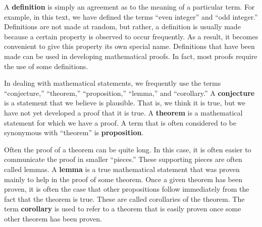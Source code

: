
A \textbf{definition}
\label{definition}%
%
 is simply an agreement as to the meaning of a particular term.  For example, in this text, we have defined the terms ``even integer'' and ``odd integer.''  Definitions are not made at random, but rather, a definition is usually made because a certain property is observed to occur frequently.  As a result, it becomes convenient to give this property its own special name.  Definitions that have been made can be used in developing mathematical proofs.  In fact, most proofs require the use of some definitions.

In dealing with mathematical statements, we frequently use the terms ``conjecture,'' ``theorem,'' ``proposition,'' ``lemma,'' and ``corollary.''  A \textbf{conjecture}
\label{conjecture}%
%
 is a statement that we believe is plausible.  That is, we think it is true, but we have not yet developed a proof that it is true.  A \textbf{theorem} 
\label{theorem}%
%
 is a mathematical statement for which we have a proof.  A term that is often considered to be synonymous with ``theorem'' is \textbf{proposition}. 
\label{proposition}%

Often the proof of a theorem can be quite long.  In this case, it is often easier to communicate the proof in smaller ``pieces.''    These supporting pieces are often called lemmas.  A 
\textbf{lemma} 
\label{lemma}%
%
 is a true mathematical statement that was proven mainly to help in the proof of some theorem.  Once a given theorem has been proven, it is often the case that other propositions follow immediately from the fact that the theorem is true.  These are called corollaries of the theorem.  The term \textbf{corollary} 
\label{corollary}%
%
 is used to refer to a theorem that is easily proven once some other theorem has been proven.
\hbreak

\endinput
